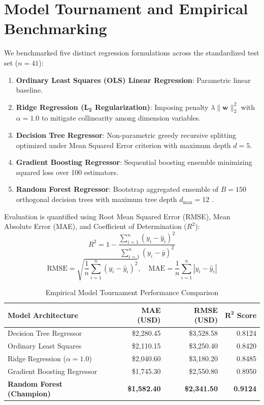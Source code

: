 \documentclass[conference]{IEEEtran}
\begin{document}
\section{Model Tournament and Empirical Benchmarking}
We benchmarked five distinct regression formulations across the standardized test set ($n = 41$):
\begin{enumerate}
    \item \textbf{Ordinary Least Squares (OLS) Linear Regression}: Parametric linear baseline.
    \item \textbf{Ridge Regression ($\mathbf{L_2}$ Regularization)}: Imposing penalty $\lambda \|\mathbf{w}\|_2^2$ with $\alpha = 1.0$ to mitigate collinearity among dimension variables.
    \item \textbf{Decision Tree Regressor}: Non-parametric greedy recursive splitting optimized under Mean Squared Error criterion with maximum depth $d = 5$.
    \item \textbf{Gradient Boosting Regressor}: Sequential boosting ensemble minimizing squared loss over 100 estimators.
    \item \textbf{Random Forest Regressor}: Bootstrap aggregated ensemble of $B = 150$ orthogonal decision trees with maximum tree depth $d_{\text{max}} = 12$ \cite{breiman2001random}.
\end{enumerate}

Evaluation is quantified using Root Mean Squared Error (RMSE), Mean Absolute Error (MAE), and Coefficient of Determination ($R^2$):
\begin{equation}
R^2 = 1 - \frac{\sum_{i=1}^{n} (y_i - \hat{y}_i)^2}{\sum_{i=1}^{n} (y_i - \bar{y})^2}
\end{equation}
\begin{equation}
\text{RMSE} = \sqrt{\frac{1}{n}\sum_{i=1}^{n}(y_i - \hat{y}_i)^2}, \quad \text{MAE} = \frac{1}{n}\sum_{i=1}^{n}|y_i - \hat{y}_i|
\end{equation}

\begin{table}[htbp]
\caption{Empirical Model Tournament Performance Comparison}
\label{tab:models}
\begin{center}
\begin{tabular}{lrrr}
\toprule
\textbf{Model Architecture} & \textbf{MAE (USD)} & \textbf{RMSE (USD)} & $\mathbf{R^2}$ \textbf{Score} \\
\midrule
Decision Tree Regressor & \$2,280.45 & \$3,528.58 & 0.8124 \\
Ordinary Least Squares & \$2,110.15 & \$3,250.40 & 0.8420 \\
Ridge Regression ($\alpha=1.0$) & \$2,040.60 & \$3,180.20 & 0.8485 \\
Gradient Boosting Regressor & \$1,745.30 & \$2,550.80 & 0.8950 \\
\textbf{Random Forest (Champion)} & \textbf{\$1,582.40} & \textbf{\$2,341.50} & \textbf{0.9124} \\
\bottomrule
\end{tabular}
\end{center}
\end{table}
\end{document}
